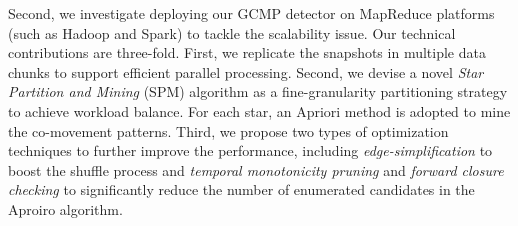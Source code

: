 


%

Second, we investigate deploying our GCMP detector on MapReduce platforms (such as Hadoop and Spark) to tackle the scalability issue. Our technical contributions are three-fold. First, we replicate the snapshots in multiple data chunks to support efficient parallel processing. Second, we devise a novel \emph{Star Partition and Mining} (SPM) algorithm as a fine-granularity partitioning strategy to achieve workload balance. For each star, an Apriori method is adopted to mine the co-movement patterns. Third, we propose two types of optimization techniques to further improve the performance, including \emph{edge-simplification} to boost the shuffle process and \emph{temporal monotonicity pruning} and 
\emph{forward closure checking} to significantly reduce the number of enumerated candidates in the Aproiro algorithm.



%
%
%


